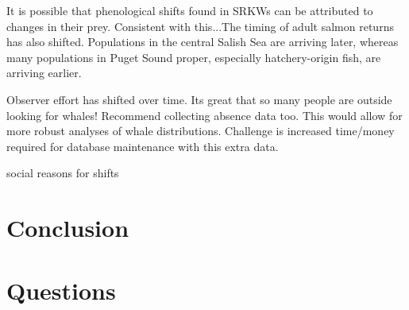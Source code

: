 \documentclass{article}
\begin{document}
\par It is possible that phenological shifts found in SRKWs can be attributed to changes in their prey. Consistent with this...The timing of adult salmon returns has also shifted. Populations in the central Salish Sea are arriving later, whereas many populations in Puget Sound proper, especially hatchery-origin fish, are arriving earlier. 
\par Observer effort has shifted over time. Its great that so many people are outside looking for whales! Recommend collecting absence data too. This would allow for more robust analyses of whale distributions. Challenge is increased time/money required for database maintenance with this extra data.
\par social reasons for shifts

\section*{Conclusion}

\section*{Questions}
\end{document}
